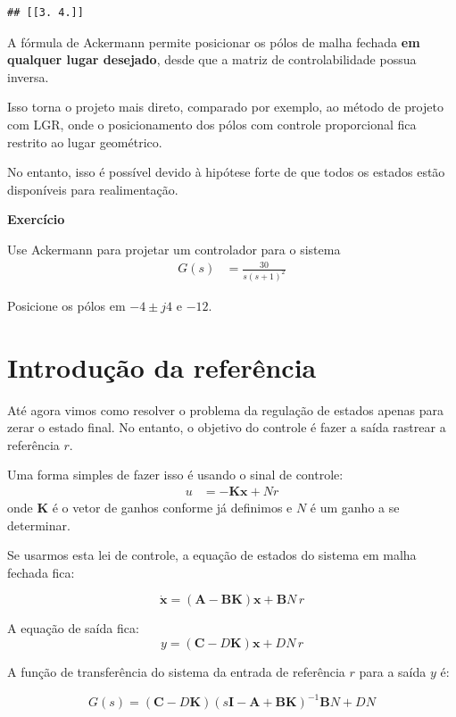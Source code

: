 \documentclass[
]{book}
\begin{document}
\begin{verbatim}
## [[3. 4.]]
\end{verbatim}

A fórmula de Ackermann permite posicionar os pólos de malha
fechada \textbf{em qualquer lugar desejado}, desde que a matriz de controlabilidade possua inversa.

Isso torna o projeto mais direto, comparado por exemplo, ao método de projeto com LGR, onde o posicionamento dos pólos com controle proporcional fica restrito ao lugar geométrico.

No entanto, isso é possível devido à hipótese forte de que todos os
estados estão disponíveis para realimentação.

\textbf{Exercício}

Use Ackermann para projetar um controlador para o sistema
\begin{align}
    G(s) &= \frac{30}{s(s+1)^2}
\end{align}

Posicione os pólos em \(-4\pm j4\) e \(-12\).

\hypertarget{introduuxe7uxe3o-da-referuxeancia}{%
\section{Introdução da referência}\label{introduuxe7uxe3o-da-referuxeancia}}

Até agora vimos como resolver o problema da regulação de estados apenas
para zerar o estado final. No entanto, o objetivo do controle é fazer a
saída rastrear a referência \(r\).

Uma forma simples de fazer isso é usando o sinal de controle:
\begin{align*}
u &= -\mathbf{Kx}+Nr
\end{align*}
onde \(\mathbf{K}\) é o vetor de ganhos conforme já definimos e \(N\) é
um ganho a se determinar.

Se usarmos esta lei de controle, a equação de estados do sistema em
malha fechada fica:

\[
\dot{\mathbf{x}} = \mathbf{(A-BK)x} + \mathbf{B}N\,r
\]

A equação de saída fica:
\[
y = (\mathbf{C}-D\mathbf{K})\mathbf{x}+DN\,r
\]

A função de transferência do sistema da entrada de referência \(r\) para a
saída \(y\) é:

\[
  G(s) = (\mathbf{C}-D\mathbf{K})(s\mathbf{I-A+BK})^{-1}\mathbf{B}N+DN
\]
\end{document}
